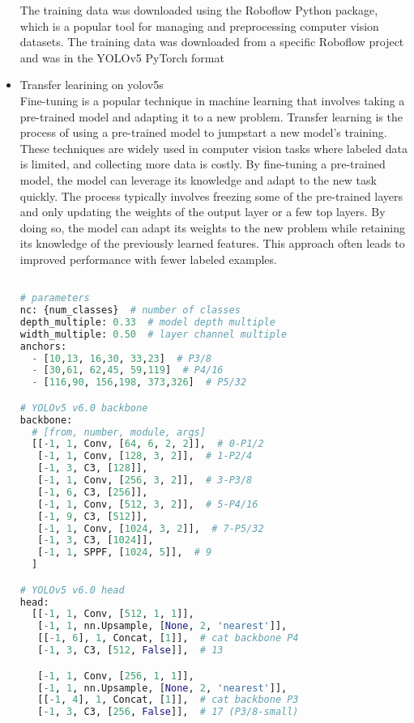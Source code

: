 \begin{itemize}
\begin{lstlisting}[language=Python]
\end{lstlisting}
The training data was downloaded using the Roboflow Python package, which is a popular tool for managing and preprocessing computer vision datasets. The training data was downloaded from a specific Roboflow project and was in the YOLOv5 PyTorch format
\item{Transfer learining on yolov5s}\\
Fine-tuning is a popular technique in machine learning that involves taking a pre-trained model and adapting it to a new problem. Transfer learning is the process of using a pre-trained model to jumpstart a new model's training. These techniques are widely used in computer vision tasks where labeled data is limited, and collecting more data is costly. By fine-tuning a pre-trained model, the model can leverage its knowledge and adapt to the new task quickly. The process typically involves freezing some of the pre-trained layers and only updating the weights of the output layer or a few top layers. By doing so, the model can adapt its weights to the new problem while retaining its knowledge of the previously learned features. This approach often leads to improved performance with fewer labeled examples.
\FloatBarrier
\begin{lstlisting}[language=Python]
  %%writetemplate /content/yolov5/models/custom_yolov5s.yaml

# parameters
nc: {num_classes}  # number of classes
depth_multiple: 0.33  # model depth multiple
width_multiple: 0.50  # layer channel multiple
anchors:
  - [10,13, 16,30, 33,23]  # P3/8
  - [30,61, 62,45, 59,119]  # P4/16
  - [116,90, 156,198, 373,326]  # P5/32

# YOLOv5 v6.0 backbone
backbone:
  # [from, number, module, args]
  [[-1, 1, Conv, [64, 6, 2, 2]],  # 0-P1/2
   [-1, 1, Conv, [128, 3, 2]],  # 1-P2/4
   [-1, 3, C3, [128]],
   [-1, 1, Conv, [256, 3, 2]],  # 3-P3/8
   [-1, 6, C3, [256]],
   [-1, 1, Conv, [512, 3, 2]],  # 5-P4/16
   [-1, 9, C3, [512]],
   [-1, 1, Conv, [1024, 3, 2]],  # 7-P5/32
   [-1, 3, C3, [1024]],
   [-1, 1, SPPF, [1024, 5]],  # 9
  ]

# YOLOv5 v6.0 head
head:
  [[-1, 1, Conv, [512, 1, 1]],
   [-1, 1, nn.Upsample, [None, 2, 'nearest']],
   [[-1, 6], 1, Concat, [1]],  # cat backbone P4
   [-1, 3, C3, [512, False]],  # 13

   [-1, 1, Conv, [256, 1, 1]],
   [-1, 1, nn.Upsample, [None, 2, 'nearest']],
   [[-1, 4], 1, Concat, [1]],  # cat backbone P3
   [-1, 3, C3, [256, False]],  # 17 (P3/8-small)


\end{lstlisting}
\end{itemize}

